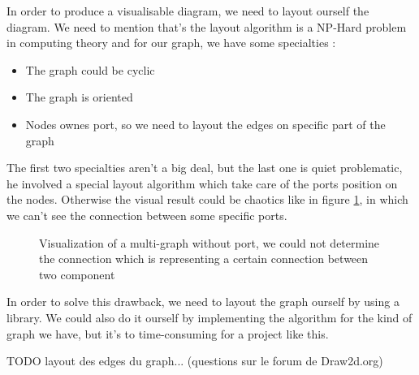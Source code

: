 In order to produce a visualisable diagram, we need to layout ourself the diagram. We need to mention that's the layout algorithm is a NP-Hard problem in computing theory\cite{Tamassia:2007:HGD:1202383} and for our graph, we have some specialties :

\begin{itemize}
\item The graph could be cyclic
\item The graph is oriented
\item Nodes ownes port, so we need to layout the edges on specific part of the graph
\end{itemize}

The first two specialties aren't a big deal, but the last one is quiet problematic, he involved a special layout algorithm which take care of the ports position on the nodes. Otherwise the visual result could be chaotics like in figure \ref{fig:multigraph-no-port}, in which we can't see the connection between some specific ports.

\begin{figure}[h]
  \centering
  \caption[Visualization of a multi-graph without port]{Visualization of a multi-graph without port, we could not determine the connection which is representing a certain connection between two component}
  \label{fig:multigraph-no-port}
\end{figure}

In order to solve this drawback, we need to layout the graph ourself by using a
library. We could also do it ourself by implementing the algorithm for the kind
of graph we have, but it's to time-consuming for a project like this.

TODO layout des edges du graph... (questions sur le forum de Draw2d.org)

